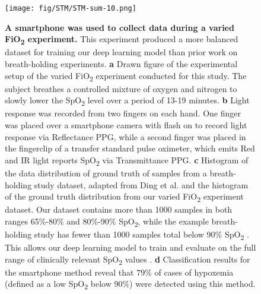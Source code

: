 \documentclass[12pt]{article}
\begin{document}
\begin{figure}
    \centering
    \texttt{[image: fig/STM/STM-sum-10.png]}
    \caption{\textbf{A smartphone was used to collect data during a varied FiO\textsubscript{2} experiment.} 
    This experiment produced a more balanced dataset for training our deep learning model than prior work on breath-holding experiments. \textbf{a} Drawn figure of the experimental setup of the varied FiO\textsubscript{2} experiment conducted for this study. The subject breathes a controlled mixture of oxygen and nitrogen to slowly lower the SpO\textsubscript{2} level over a period of 13-19 minutes.
    \textbf{b} Light response was recorded from two fingers on each hand.  One finger was placed over a smartphone camera with flash on to record light response via Reflectance PPG, while a second finger was placed in the fingerclip of a transfer standard pulse oximeter, which emits Red and IR light reports SpO\textsubscript{2} via Transmittance PPG. 
    \textbf{c} Histogram of the data distribution of ground truth of samples from a breath-holding study dataset, adapted from Ding et al. \cite{ding2018measuring} and the histogram of the ground truth distribution from our varied FiO\textsubscript{2} experiment dataset. Our dataset contains more than 1000 samples in both ranges 65\%-80\% and 80\%-90\% SpO\textsubscript{2}, while the example breath-holding study has fewer than 1000 samples total below 90\% SpO\textsubscript{2} \cite{ding2018measuring}. This allows our deep learning model to train and evaluate on the full range of clinically relevant SpO\textsubscript{2} values \cite{us2013pulse}. %
    \textbf{d} Classification results for the smartphone method reveal that $79\%$ of cases of hypoxemia (defined as a low SpO\textsubscript{2} below 90\%) were detected using this method.}
    \label{STM-summ}
\end{figure}
\end{document}
